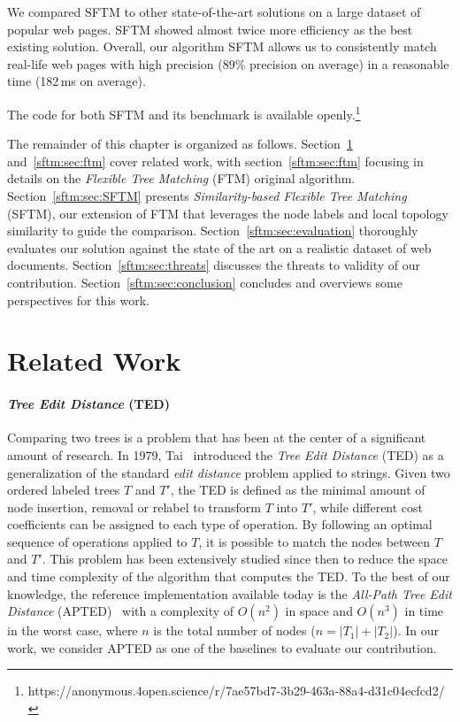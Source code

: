 We compared SFTM to other state-of-the-art solutions on a large dataset of popular web pages.
SFTM showed almost twice more efficiency as the best existing solution.
Overall, our algorithm SFTM allows us to consistently match real-life web pages with high precision (89\% precision on average) in a reasonable time (182\,ms on average).

The code for both SFTM and its benchmark is available openly.\footnote{https://anonymous.4open.science/r/7ae57bd7-3b29-463a-88a4-d31c04ecfcd2/}

The remainder of this chapter is organized as follows.
Section~\ref{sftm:sec:related_work} and~\ref{sftm:sec:ftm} cover related work, with section~\ref{sftm:sec:ftm} focusing in details on the \emph{Flexible Tree Matching} (FTM) original algorithm.
Section~\ref{sftm:sec:SFTM} presents \emph{Similarity-based Flexible Tree Matching} (SFTM), our extension of FTM that leverages the node labels and local topology similarity to guide the comparison.
Section~\ref{sftm:sec:evaluation} thoroughly evaluates our solution against the state of the art on a realistic dataset of web documents.
Section~\ref{sftm:sec:threats} discusses the threats to validity of our contribution.
Section~\ref{sftm:sec:conclusion} concludes and overviews some perspectives for this work.

\section{Related Work}\label{sftm:sec:related_work}
\paragraph{\bf \emph{Tree Edit Distance} (TED)}\label{sftm:sec:ted}
Comparing two trees is a problem that has been at the center of a significant amount of research.
In 1979, Tai~\cite{Tai1979} introduced the \emph{Tree Edit Distance} (TED) as a generalization of the standard \emph{edit distance} problem applied to strings.
Given two ordered labeled trees $T$ and $T'$, the TED is defined as the minimal amount of node insertion, removal or relabel to transform $T$ into $T'$, while different cost coefficients can be assigned to each type of operation.
By following an optimal sequence of operations applied to $T$, it is possible to match the nodes between $T$ and $T'$.
This problem has been extensively studied since then to reduce the space and time complexity of the algorithm that computes the TED.
To the best of our knowledge, the reference implementation available today is the \emph{All-Path Tree Edit Distance} (APTED)~\cite{Pawlik2011, pawlik2015efficient, pawlik2016tree} with a complexity of $O(n^2)$ in space and $O(n^3)$ in time in the worst case, where $n$ is the total number of nodes ($n = |T_1|+|T_2|$).
In our work, we consider APTED as one of the baselines to evaluate our contribution.

